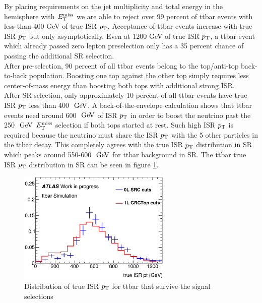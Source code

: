 \indent By placing requirements on the jet multiplicity and total energy in the hemisphere with $E_{\mathrm{T}}^{\mathrm{miss}}$ we are able to reject over 99 percent of ttbar events with less than 400 GeV of true ISR $p_{\mathrm{T}}$.  Acceptance of ttbar events increase with true ISR $p_{\mathrm{T}}$ but only asymptotically.  Even at 1200 GeV of true ISR $p_{\mathrm{T}}$, a ttbar event which already passed zero lepton preselection only has a 35 percent chance of passing the additional SR selection.  \\

\indent  After pre-selection, 90 percent of all ttbar events belong to the top/anti-top back-to-back population.  Boosting one top against the other top simply requires less center-of-mass energy than boosting both tops with additional strong ISR. \\

\indent After SR selection, only approximately 10 percent of all ttbar events have true ISR $p_{\mathrm{T}}$ less than 400 $\gev$.  A back-of-the-envelope calculation shows that ttbar events need around 600 $\gev$ of ISR $p_{\mathrm{T}}$ in order to boost the neutrino past the 250 $\gev$ $E_{\mathrm{T}}^{\mathrm{miss}}$ selection if both tops started at rest.  Such high ISR $p_{\mathrm{T}}$ is required because the neutrino must share the ISR $p_{\mathrm{T}}$ with the 5 other particles in the ttbar decay.  This completely agrees with the true ISR $p_{\mathrm{T}}$ distribution in SR which peaks around 550-600 $\gev$ for ttbar background in SR.  The ttbar true ISR $p_{\mathrm{T}}$ distribution in SR can be seen in figure \ref{fig:ttbar:SR:trueISRpt}.  \\

\begin{figure}[h!]
  \centering
	\includegraphics[width=0.65\textwidth]{./figures/ttbar/truePtISR_SRC_CRC_compare.eps}
\caption{\label{fig:ttbar:SR:trueISRpt}{Distribution of true ISR $p_{\mathrm{T}}$ for ttbar that survive the signal selections}}
\end{figure}

